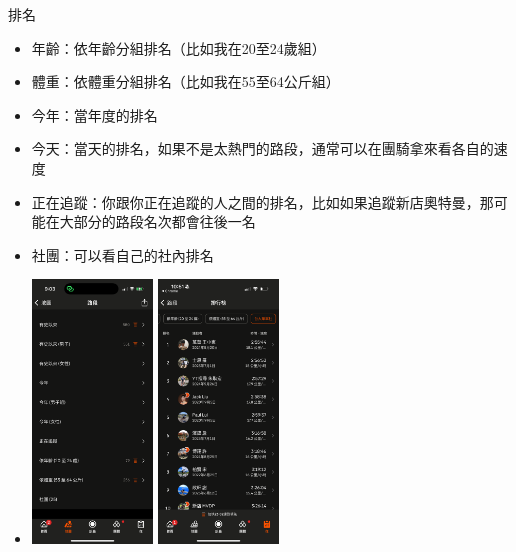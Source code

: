 \begin{frame}{排名}
\begin{multicols}{2}
\begin{itemize}
\item 年齡：依年齡分組排名（比如我在20至24歲組）
\item 體重：依體重分組排名（比如我在55至64公斤組）
\item 今年：當年度的排名
\item 今天：當天的排名，如果不是太熱門的路段，通常可以在團騎拿來看各自的速度
\item	正在追蹤：你跟你正在追蹤的人之間的排名，比如如果追蹤新店奧特曼，那可能在大部分的路段名次都會往後一名
\item 社團：可以看自己的社內排名
\newpage
\item \includegraphics[height=7cm]{rank.png}
\includegraphics[height=7cm]{rank2.png}
\end{itemize}
\end{multicols}
\end{frame}

